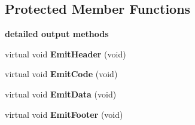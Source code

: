 \subsection*{Protected Member Functions}
\begin{Indent}{\bf detailed output methods}\par
\begin{DoxyCompactItemize}
\item 
\hypertarget{classCBackendx86_a2bf2900833a3d37c115498a9805caff6}{virtual void {\bfseries Emit\-Header} (void)}\label{classCBackendx86_a2bf2900833a3d37c115498a9805caff6}

\item 
\hypertarget{classCBackendx86_aba678b88e4fe218137f870301fb501f9}{virtual void {\bfseries Emit\-Code} (void)}\label{classCBackendx86_aba678b88e4fe218137f870301fb501f9}

\item 
\hypertarget{classCBackendx86_a4ae1d556489ec5d79f20f7c6383e31cf}{virtual void {\bfseries Emit\-Data} (void)}\label{classCBackendx86_a4ae1d556489ec5d79f20f7c6383e31cf}

\item 
\hypertarget{classCBackendx86_a9e11130bbe7191e605bf831524ab95c7}{virtual void {\bfseries Emit\-Footer} (void)}\label{classCBackendx86_a9e11130bbe7191e605bf831524ab95c7}

\end{DoxyCompactItemize}
\end{Indent}
